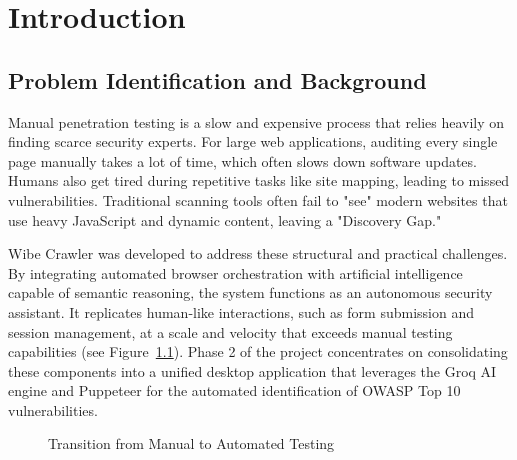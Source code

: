 \documentclass[12pt,oneside,a4paper]{book}
\begin{document}
\newpage


\mainmatter
\setlength{\parskip}{5pt}
\pagestyle{fancy}

\chapter{Introduction}
\label{chap:introduction}

\section{Problem Identification and Background}

Manual penetration testing is a slow and expensive process that relies heavily on finding scarce security experts. For large web applications, auditing every single page manually takes a lot of time, which often slows down software updates. Humans also get tired during repetitive tasks like site mapping, leading to missed vulnerabilities. Traditional scanning tools often fail to "see" modern websites that use heavy JavaScript and dynamic content, leaving a "Discovery Gap."

Wibe Crawler was developed to address these structural and practical challenges. By integrating automated browser orchestration with artificial intelligence capable of semantic reasoning, the system functions as an autonomous security assistant. It replicates human-like interactions, such as form submission and session management, at a scale and velocity that exceeds manual testing capabilities (see Figure~\ref{fig:manual-to-auto}). Phase 2 of the project concentrates on consolidating these components into a unified desktop application that leverages the Groq AI engine and Puppeteer for the automated identification of OWASP Top 10 vulnerabilities.

\begin{figure}[ht]
\centering
{}
\caption{Transition from Manual to Automated Testing}
\label{fig:manual-to-auto}
\end{figure}
\end{document}
